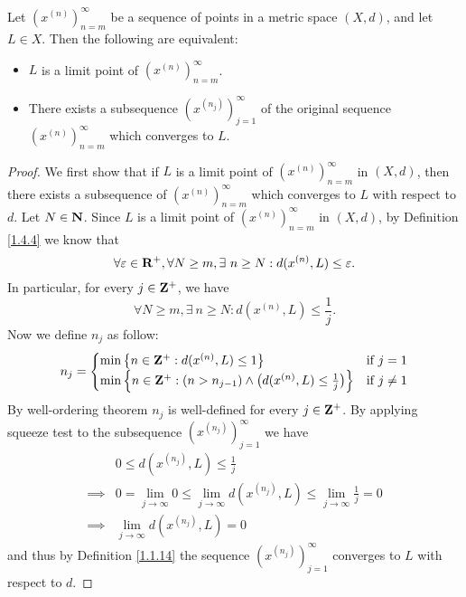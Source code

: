 \begin{proposition}\label{1.4.5}
    Let \((x^{(n)})_{n = m}^\infty\) be a sequence of points in a metric space \((X, d)\), and let \(L \in X\).
    Then the following are equivalent:
    \begin{itemize}
        \item \(L\) is a limit point of \((x^{(n)})_{n = m}^\infty\).
        \item There exists a subsequence \((x^{(n_j)})_{j = 1}^\infty\) of the original sequence \((x^{(n)})_{n = m}^\infty\) which converges to \(L\).
    \end{itemize}
\end{proposition}

\begin{proof}
    We first show that if \(L\) is a limit point of \((x^{(n)})_{n = m}^\infty\) in \((X, d)\), then there exists a subsequence of \((x^{(n)})_{n = m}^\infty\) which converges to \(L\) with respect to \(d\).
    Let \(N \in \mathbf{N}\).
    Since \(L\) is a limit point of \((x^{(n)})_{n = m}^\infty\) in \((X, d)\), by Definition \ref{1.4.4} we know that
    \[
        \forall \varepsilon \in \mathbf{R}^+, \forall N \geq m, \exists\ n \geq N : d(x^{(n)}, L) \leq \varepsilon.
    \]
    In particular, for every \(j \in \mathbf{Z}^+\), we have
    \[
        \forall N \geq m, \exists\ n \geq N : d(x^{(n)}, L) \leq \frac{1}{j}.
    \]
    Now we define \(n_j\) as follow:
    \[
        n_j = \begin{cases}
            \min\big\{n \in \mathbf{Z}^+ : d(x^{(n)}, L) \leq 1\big\}                                           & \text{if } j = 1    \\
            \min\Big\{n \in \mathbf{Z}^+ : (n > n_{j - 1}) \land \big(d(x^{(n)}, L) \leq \frac{1}{j}\big)\Big\} & \text{if } j \neq 1
        \end{cases}
    \]
    By well-ordering theorem \(n_j\) is well-defined for every \(j \in \mathbf{Z}^+\).
    By applying squeeze test to the subsequence \((x^{(n_j)})_{j = 1}^\infty\) we have
    \begin{align*}
                 & 0 \leq d(x^{(n_j)}, L) \leq \frac{1}{j}                                                                     \\
        \implies & 0 = \lim_{j \to \infty} 0 \leq \lim_{j \to \infty} d(x^{(n_j)}, L) \leq \lim_{j \to \infty} \frac{1}{j} = 0 \\
        \implies & \lim_{j \to \infty} d(x^{(n_j)}, L) = 0
    \end{align*}
    and thus by Definition \ref{1.1.14} the sequence \((x^{(n_j)})_{j = 1}^\infty\) converges to \(L\) with respect to \(d\).


\end{proof}
